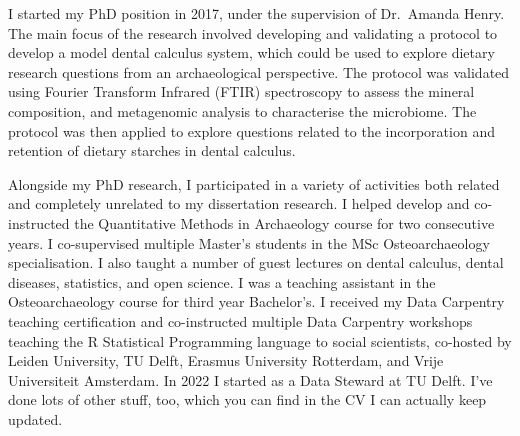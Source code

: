 \documentclass[
  b5paper,
]{book}
\begin{document}
I started my PhD position in 2017, under the supervision of Dr.~Amanda
Henry. The main focus of the research involved developing and validating
a protocol to develop a model dental calculus system, which could be
used to explore dietary research questions from an archaeological
perspective. The protocol was validated using Fourier Transform Infrared
(FTIR) spectroscopy to assess the mineral composition, and metagenomic
analysis to characterise the microbiome. The protocol was then applied
to explore questions related to the incorporation and retention of
dietary starches in dental calculus.

Alongside my PhD research, I participated in a variety of activities
both related and completely unrelated to my dissertation research. I
helped develop and co-instructed the Quantitative Methods in Archaeology
course for two consecutive years. I co-supervised multiple Master's
students in the MSc Osteoarchaeology specialisation. I also taught a
number of guest lectures on dental calculus, dental diseases,
statistics, and open science. I was a teaching assistant in the
Osteoarchaeology course for third year Bachelor's. I received my Data
Carpentry teaching certification and co-instructed multiple Data
Carpentry workshops teaching the R Statistical Programming language to
social scientists, co-hosted by Leiden University, TU Delft, Erasmus
University Rotterdam, and Vrije Universiteit Amsterdam. In 2022 I
started as a Data Steward at TU Delft. I've done lots of other stuff,
too, which you can find in the CV I can actually keep updated.

\backmatter
\end{document}
